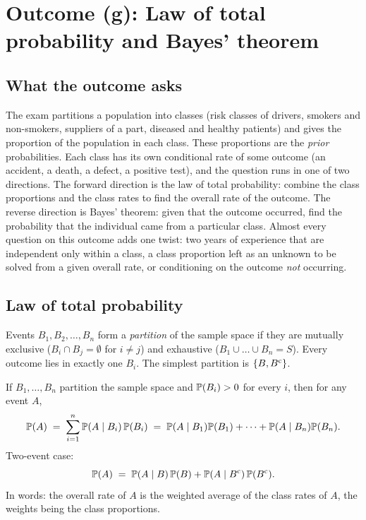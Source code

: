 \section{Outcome (g): Law of total probability and Bayes' theorem}

\subsection{What the outcome asks}

The exam partitions a population into classes (risk classes of drivers, smokers and
non-smokers, suppliers of a part, diseased and healthy patients) and gives the proportion of
the population in each class. These proportions are the \emph{prior} probabilities. Each
class has its own conditional rate of some outcome (an accident, a death, a defect, a positive
test), and the question runs in one of two directions. The forward direction is the law of
total probability: combine the class proportions and the class rates to find the overall rate
of the outcome. The reverse direction is Bayes' theorem: given that the outcome occurred,
find the probability that the individual came from a particular class. Almost every question
on this outcome adds one twist: two years of experience that are independent only within a
class, a class proportion left as an unknown to be solved from a given overall rate, or
conditioning on the outcome \emph{not} occurring.

\subsection{Law of total probability}

Events $B_1, B_2, \dots, B_n$ form a \emph{partition} of the sample space if they are
mutually exclusive ($B_i \cap B_j = \emptyset$ for $i \neq j$) and exhaustive
($B_1 \cup \dots \cup B_n = S$). Every outcome lies in exactly one $B_i$. The simplest
partition is $\{B, B^{\mathrm{c}}\}$.

\begin{keyfact}
If $B_1, \dots, B_n$ partition the sample space and $\mathbb{P}(B_i) > 0$ for every $i$, then for
any event $A$,
\[
\mathbb{P}(A) \;=\; \sum_{i=1}^{n} \mathbb{P}(A \mid B_i)\,\mathbb{P}(B_i)
\;=\; \mathbb{P}(A \mid B_1)\mathbb{P}(B_1) + \dots + \mathbb{P}(A \mid B_n)\mathbb{P}(B_n).
\]
Two-event case:
\[
\mathbb{P}(A) \;=\; \mathbb{P}(A \mid B)\,\mathbb{P}(B) + \mathbb{P}(A \mid B^{\mathrm{c}})\,\mathbb{P}(B^{\mathrm{c}}).
\]
In words: the overall rate of $A$ is the weighted average of the class rates of $A$, the
weights being the class proportions.
\end{keyfact}

